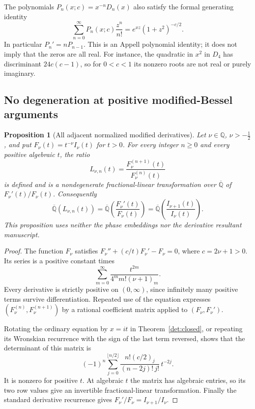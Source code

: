 \documentclass[11pt,a4paper]{article}
\newtheorem{proposition}[theorem]{Proposition}
\theoremstyle{definition}\newtheorem{definition}[theorem]{Definition}
\theoremstyle{remark}\newtheorem{remark}[theorem]{Remark}
\begin{document}
The polynomials $P_n(x;c)=x^{-n}D_n(x)$ also satisfy the formal generating
identity
\[
 \sum_{n=0}^\infty P_n(x;c)\frac{z^n}{n!}
 =e^{xz}(1+z^2)^{-c/2}.
\]
In particular $P_n'=nP_{n-1}$.  This is an Appell polynomial identity;
it does not imply that the zeros are all real.  For instance, the
quadratic in $x^2$ in $D_4$ has discriminant $24c(c-1)$, so for
$0<c<1$ its nonzero roots are not real or purely imaginary.

\subsection{No degeneration at positive modified-Bessel arguments}

\begin{proposition}[All adjacent normalized modified derivatives]
\label{det:modified}
Let $\nu\in\mathbb Q$, $\nu>-\tfrac12$, and put
$F_\nu(t)=t^{-\nu}I_\nu(t)$ for $t>0$.  For every integer $n\ge0$
and every positive algebraic $t$, the ratio
\[
 L_{\nu,n}(t)=\frac{F_\nu^{(n+1)}(t)}{F_\nu^{(n)}(t)}
\]
is defined and is a nondegenerate fractional-linear transformation over
$\overline{\mathbb Q}$ of $F_\nu'(t)/F_\nu(t)$.  Consequently
\[
 \overline{\mathbb Q}(L_{\nu,n}(t))
 =\overline{\mathbb Q}\!\left(\frac{F_\nu'(t)}{F_\nu(t)}\right)
 =\overline{\mathbb Q}\!\left(\frac{I_{\nu+1}(t)}{I_\nu(t)}\right).
\]
This proposition uses neither the phase embeddings nor the derivative
resultant manuscript.
\end{proposition}

\begin{proof}
The function $F_\nu$ satisfies
$F_\nu''+(c/t)F_\nu'-F_\nu=0$, where $c=2\nu+1>0$.
Its series is a positive constant times
\[
 \sum_{m=0}^\infty\frac{t^{2m}}{4^m m!(\nu+1)_m}.
\]
Every derivative is strictly positive on $(0,\infty)$, since infinitely
many positive terms survive differentiation.  Repeated use of the
equation expresses $(F_\nu^{(n)},F_\nu^{(n+1)})$ by a rational
coefficient matrix applied to $(F_\nu,F_\nu')$.

Rotating the ordinary equation by $x=it$ in
Theorem~\ref{det:closed}, or repeating its Wronskian recurrence with the
sign of the last term reversed, shows that the determinant of this
matrix is
\[
 (-1)^n\sum_{j=0}^{\lfloor n/2\rfloor}
 \frac{n!(c/2)_j}{(n-2j)!\,j!}\,t^{-2j}.
\]
It is nonzero for positive $t$.  At algebraic $t$ the matrix has
algebraic entries, so its two row values give an invertible
fractional-linear transformation.  Finally the standard derivative
recurrence gives $F_\nu'/F_\nu=I_{\nu+1}/I_\nu$.
\end{proof}
\end{document}
